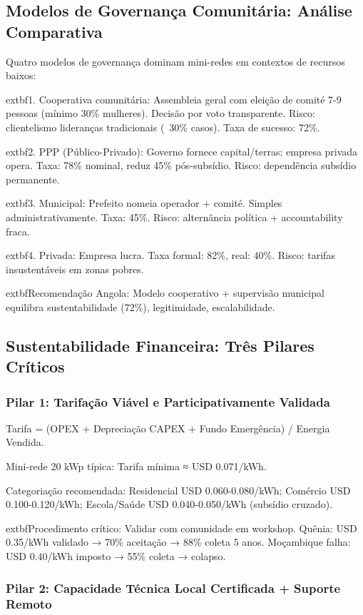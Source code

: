 \documentclass[12pt, a4paper]{article}
\begin{document}
{{{{{{{{{{{\subsection{Modelos de Governança Comunitária: Análise Comparativa}

Quatro modelos de governança dominam mini-redes em contextos de recursos baixos:

	extbf{1. Cooperativa comunitária}: Assembleia geral com eleição de comité 7-9 pessoas (mínimo 30\% mulheres). Decisão por voto transparente. Risco: clientelismo lideranças tradicionais (~30\% casos). Taxa de sucesso: 72\%.

	extbf{2. PPP (Público-Privado)}: Governo fornece capital/terras; empresa privada opera. Taxa: 78\% nominal, reduz 45\% pós-subsídio. Risco: dependência subsídio permanente.

	extbf{3. Municipal}: Prefeito nomeia operador + comité. Simples administrativamente. Taxa: 45\%. Risco: alternância política + accountability fraca.

	extbf{4. Privada}: Empresa lucra. Taxa formal: 82\%, real: 40\%. Risco: tarifas insustentáveis em zonas pobres.

	extbf{Recomendação Angola}: Modelo cooperativo + supervisão municipal equilibra sustentabilidade (72\%), legitimidade, escalabilidade.

\subsection{Sustentabilidade Financeira: Três Pilares Críticos}

\subsubsection{Pilar 1: Tarifação Viável e Participativamente Validada}

Tarifa = (OPEX + Depreciação CAPEX + Fundo Emergência) / Energia Vendida.

Mini-rede 20 kWp típica: Tarifa mínima ≈ USD 0.071/kWh.

Categoriação recomendada: Residencial USD 0.060-0.080/kWh; Comércio USD 0.100-0.120/kWh; Escola/Saúde USD 0.040-0.050/kWh (subsídio cruzado).

	extbf{Procedimento crítico}: Validar com comunidade em workshop. Quênia: USD 0.35/kWh validado → 70\% aceitação → 88\% coleta 5 anos. Moçambique falha: USD 0.40/kWh imposto → 55\% coleta → colapso.

\subsubsection{Pilar 2: Capacidade Técnica Local Certificada + Suporte Remoto}

}}}}}}}}}}}
\end{document}
